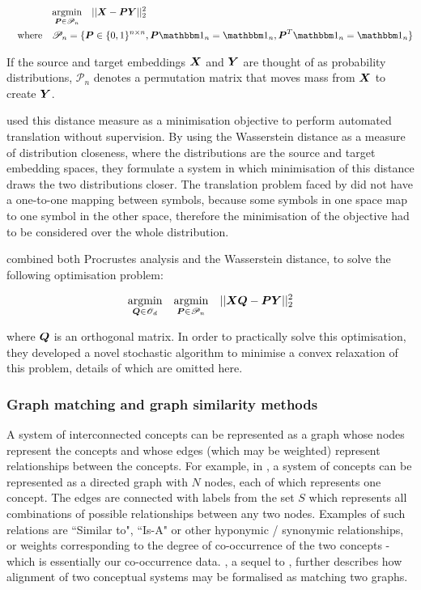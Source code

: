 \begin{equation}
\begin{split}
    &\argmin{\vecP \in \mathscr{P}_n} \quad || \vecX - \vecP \vecY ||_2^2 \\
    \spaced{where}&\mathscr{P}_n = \{\vecP \in \{0, 1\}^{n \times n}, \vecP \one_n = \one_n, \vecP^T \one_n = \one_n \}
\end{split}
\end{equation}

If the source and target embeddings $\boldsymbol{X}$ and $\boldsymbol{Y}$ are thought of as probability distributions, $\mathscr{P}_n$ denotes a permutation matrix that moves mass from $\boldsymbol{X}$ to create $\boldsymbol{Y}$. 

\cite{Zhang2017EarthMD} used this distance measure as a minimisation objective to perform automated translation without supervision. By using the Wasserstein distance as a measure of distribution closeness, where the distributions are the source and target embedding spaces, they formulate a system in which minimisation of this distance draws the two distributions closer. The translation problem faced by \cite{Zhang2017EarthMD} did not have a one-to-one mapping between symbols, because some symbols in one space map to one symbol in the other space, therefore the minimisation of the objective had to be considered over the whole distribution. 

\cite{UnsupervisedAlignmentWP} combined both Procrustes analysis and the Wasserstein distance, to solve the following optimisation problem:

\begin{equation}
\begin{split}
\underset{\boldsymbol{Q} \in \mathscr{O}_d}{\operatorname{argmin}} \quad \underset{\boldsymbol{P} \in \mathscr{P}_n }{\operatorname{argmin}}\quad || \boldsymbol{X} \boldsymbol{Q} - \boldsymbol{P} \boldsymbol{Y}||_2^2
\end{split}
\end{equation}

where $\boldsymbol{Q}$ is an orthogonal matrix. In order to practically solve this optimisation, they developed a novel stochastic algorithm to minimise a convex relaxation of this problem, details of which are omitted here. 

\newpage
\subsubsection{Graph matching and graph similarity methods}

A system of interconnected concepts can be represented as a graph whose nodes represent the concepts and whose edges (which may be weighted) represent relationships between the concepts. For example, in \cite{Absurdist2}, a system of concepts can be represented as a directed graph with $N$ nodes, each of which represents one concept. The edges are connected with labels from the set $S$ which represents all combinations of possible relationships between any two nodes. Examples of such relations are ``Similar to", ``Is-A" or other hyponymic / synonymic relationships, or weights corresponding to the degree of co-occurrence of the two concepts - which is essentially our co-occurrence data. \cite{Absurdist2}, a sequel to \cite{GOLDSTONE2002295}, further describes how alignment of two conceptual systems may be formalised as matching two graphs. 

